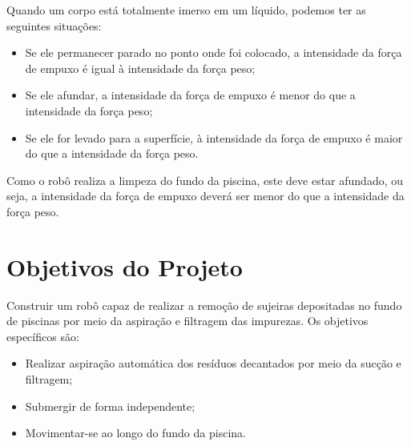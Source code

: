 Quando um corpo está totalmente imerso em um líquido, podemos ter as seguintes situações:

\begin{itemize}
\item Se ele permanecer parado no ponto onde foi colocado, a intensidade da força de empuxo é igual à intensidade da força peso;
\item Se ele afundar, a intensidade da força de empuxo é menor do que a intensidade da força peso;
\item Se ele for levado para a superfície, à intensidade da força de empuxo é maior do que a intensidade da força peso.
\end{itemize}

Como o robô realiza a limpeza do fundo da piscina, este deve estar afundado, ou seja, a intensidade da força de empuxo deverá ser menor do que a intensidade da força peso.

\section{Objetivos do Projeto}
Construir um robô capaz de realizar a remoção de sujeiras depositadas no fundo de piscinas por meio da aspiração e filtragem das impurezas. Os objetivos específicos são:

\begin{itemize}
\item Realizar aspiração automática dos resíduos decantados por meio da sucção e filtragem;
\item Submergir de forma independente;
\item Movimentar-se ao longo do fundo da piscina.
\end{itemize}

